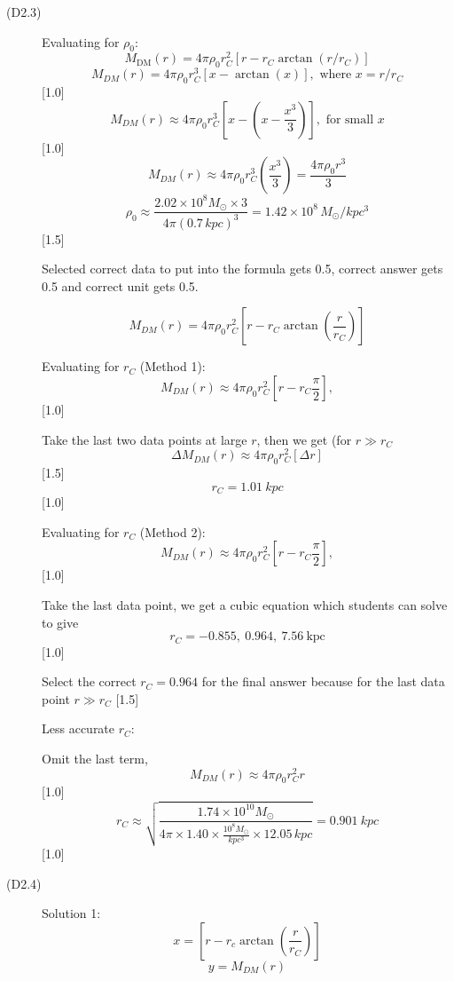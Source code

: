 \begin{description}
\item[(D2.3)] Evaluating for $\rho_0$:
  \[ M_{\mathrm{DM}}(r) = 4\pi\rho_0 r_C^2
     \left[r - r_C\arctan(r/r_C)\right] \]
  \[ M_{DM}(r) = 4\pi\rho_0 r_C^3\left[x - \arctan(x)\right],
     \text{ where } x = r/r_C \]
  \hfill[1.0]
  \[ M_{DM}(r) \approx 4\pi\rho_0 r_C^3
     \left[x - \left(x - \frac{x^3}{3}\right)\right],
     \text{ for small } x \]
  \hfill[1.0]
  \[ M_{DM}(r) \approx 4\pi\rho_0 r_C^3\left(\frac{x^3}{3}\right)
     = \frac{4\pi\rho_0 r^3}{3} \]
  \[ \rho_0 \approx \frac{2.02\times 10^{8}M_\odot\times 3}
     {4\pi(0.7\,kpc)^3} = 1.42\times 10^{8}\,M_\odot/kpc^3 \]
  \hfill[1.5]

  Selected correct data to put into the formula gets 0.5, correct answer
  gets 0.5 and correct unit gets 0.5.

  \[ M_{DM}(r) = 4\pi\rho_0 r_C^2
     \left[r - r_C\arctan\left(\frac{r}{r_C}\right)\right] \]

  Evaluating for $r_C$ (Method 1):
  \[ M_{DM}(r) \approx 4\pi\rho_0 r_C^2
     \left[r - r_C\frac{\pi}{2}\right], \]
  \hfill[1.0]

  Take the last two data points at large $r$, then we get (for
  $r \gg r_C$
  \[ \Delta M_{DM}(r) \approx 4\pi\rho_0 r_C^2\left[\Delta r\right] \]
  \hfill[1.5]
  \[ r_C = 1.01\ kpc \]
  \hfill[1.0]

  Evaluating for $r_C$ (Method 2):
  \[ M_{DM}(r) \approx 4\pi\rho_0 r_C^2
     \left[r - r_C\frac{\pi}{2}\right], \]
  \hfill[1.0]

  Take the last data point, we get a cubic equation which students can
  solve to give
  \[ r_C = -0.855,\ 0.964,\ 7.56\ \text{kpc} \]
  \hfill[1.0]

  Select the correct $r_C = 0.964$ for the final answer because for the
  last data point $r \gg r_C$ \hfill[1.5]

  Less accurate $r_C$:

  Omit the last term,
  \[ M_{DM}(r) \approx 4\pi\rho_0 r_C^2 r \]
  \hfill[1.0]
  \[ r_C \approx \sqrt{\frac{1.74\times 10^{10}M_\odot}
     {4\pi\times 1.40\times\frac{10^{8}M_\odot}{kpc^3}\times 12.05\,kpc}}
     = 0.901\ kpc \]
  \hfill[1.0]

\item[(D2.4)] Solution 1:
  \[ x = \left[r - r_c\arctan\left(\frac{r}{r_C}\right)\right] \]
  \[ y = M_{DM}(r) \]


\end{description}
